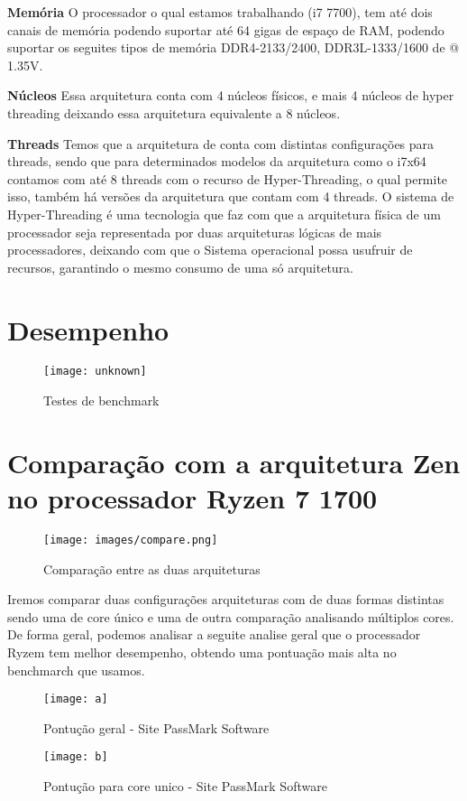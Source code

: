 \documentclass[12pt,a4paper,brazilian,utf8]{ppgsi}
\begin{document}
    \textbf{Memória}
    O processador o qual estamos trabalhando (i7 7700), tem até dois canais de memória podendo suportar até 64 gigas de espaço de RAM, podendo suportar os seguites tipos de memória DDR4-2133/2400, DDR3L-1333/1600 de @ 1.35V.
    
    \textbf{Núcleos}
    Essa arquitetura conta com 4 núcleos físicos, e mais 4 núcleos de hyper threading deixando essa arquitetura equivalente a 8 núcleos.
    
    \textbf{Threads}
    Temos que a arquitetura de conta com distintas configurações para threads, sendo que para determinados modelos da arquitetura como o i7x64 contamos com até 8 threads com o recurso de Hyper-Threading, o qual permite isso, também há versões da arquitetura que contam com 4 threads.
    O sistema de Hyper-Threading é uma tecnologia que faz com que a arquitetura física de um processador seja representada por duas arquiteturas lógicas de mais processadores, deixando com que o Sistema operacional possa usufruir de recursos, garantindo o mesmo consumo de uma só arquitetura.

\section{Desempenho}
    
    \begin{figure}[H]
		\centering
		\caption{Testes de benchmark}
		\texttt{[image: unknown]}
	\end{figure}
    
\section{Comparação com a arquitetura Zen no processador Ryzen 7 1700}
    
    \begin{figure}[H]
		\centering
		\caption{Comparação entre as duas arquiteturas}
		\texttt{[image: images/compare.png]}
	\end{figure}
	
    \newpage 
    Iremos comparar duas configurações arquiteturas com de duas formas distintas sendo uma de core único e uma de outra comparação analisando múltiplos cores. De forma geral, podemos analisar a seguite analise geral que o processador Ryzem tem melhor desempenho, obtendo uma pontuação mais alta no benchmarch que usamos.
	\begin{figure}[H]
		\centering
		\caption{Pontução geral - Site PassMark Software}
		\texttt{[image: a]}
	\end{figure}
	\begin{figure}[H]
		\centering
		\caption{Pontução para core unico - Site PassMark Software}
		\texttt{[image: b]}
	\end{figure}
	
\end{document}
